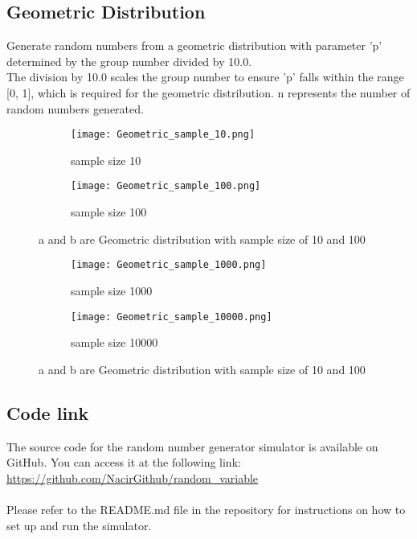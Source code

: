 \documentclass[12pt]{article}
\begin{document}
\newpage
\subsection{Geometric Distribution}
Generate random numbers from a geometric distribution with parameter 'p' determined by the group number divided by 10.0.\\
The division by 10.0 scales the group number to ensure 'p' falls within the range [0, 1], which is required for the geometric distribution. n represents the number of random numbers generated.\\

\begin{figure}[htb!]
    \centering
    \begin{subfigure}{0.45\textwidth}
        \centering
        \texttt{[image: Geometric\_sample\_10.png]}
        \caption{sample size 10}
        \label{fig:sub1}
    \end{subfigure}
    \hfill
    \begin{subfigure}{0.45\textwidth}
        \centering
        \texttt{[image: Geometric\_sample\_100.png]} 
        \caption{sample size 100}
        \label{fig:sub2}
    \end{subfigure}
    \caption{a and b are Geometric distribution with sample size of 10 and 100}
    \label{fig:main}
\end{figure}

\begin{figure}[htb!]
    \centering
    \begin{subfigure}{0.45\textwidth}
        \centering
        \texttt{[image: Geometric\_sample\_1000.png]}
        \caption{sample size 1000}
        \label{fig:sub1}
    \end{subfigure}
    \hfill
    \begin{subfigure}{0.45\textwidth}
        \centering
        \texttt{[image: Geometric\_sample\_10000.png]} 
        \caption{sample size 10000}
        \label{fig:sub2}
    \end{subfigure}
    \caption{a and b are Geometric distribution with sample size of 10 and 100}
    \label{fig:main}
\end{figure}



\newpage

\subsection{Code link}
The source code for the random number generator simulator is available on GitHub. You can access it at the following link:
\url{https://github.com/NacirGithub/random_variable}\\
\\
Please refer to the README.md file in the repository for instructions on how to set up and run the simulator.
\end{document}
